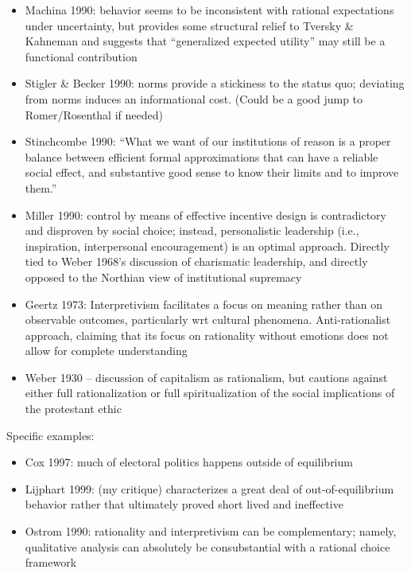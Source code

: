 \documentclass[12pt]{article}
\begin{document}
\begin{itemize}
    \item Machina 1990: behavior seems to be inconsistent with rational expectations under uncertainty, but provides some structural relief to Tversky \& Kahneman and suggests that ``generalized expected utility'' may still be a functional contribution
    \item Stigler \& Becker 1990: norms provide a stickiness to the status quo; deviating from norms induces an informational cost. (Could be a good jump to Romer/Rosenthal if needed)
    \item Stinchcombe 1990: ``What we want of our institutions of reason is a proper balance between efficient formal approximations that can have a reliable social effect, and substantive good sense to know their limits and to improve them.''
    \item Miller 1990: control by means of effective incentive design is contradictory and disproven by social choice; instead, personalistic leadership (i.e., inspiration, interpersonal encouragement) is an optimal approach. Directly tied to Weber 1968's discussion of charismatic leadership, and directly opposed to the Northian view of institutional supremacy
    \item Geertz 1973: Interpretivism facilitates a focus on meaning rather than on observable outcomes, particularly wrt cultural phenomena. Anti-rationalist approach, claiming that its focus on rationality without emotions does not allow for complete understanding
    \item Weber 1930 -- discussion of capitalism as rationalism, but cautions against either full rationalization or full spiritualization of the social implications of the protestant ethic
\end{itemize}

Specific examples:

\begin{itemize}
    \item Cox 1997: much of electoral politics happens outside of equilibrium
    \item Lijphart 1999: (my critique) characterizes a great deal of out-of-equilibrium behavior rather that ultimately proved short lived and ineffective
    \item Ostrom 1990: rationality and interpretivism can be complementary; namely, qualitative analysis can absolutely be consubstantial with a rational choice framework
\end{itemize}
\end{document}
